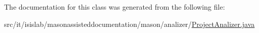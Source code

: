 The documentation for this class was generated from the following file\-:\begin{DoxyCompactItemize}
\item 
src/it/isislab/masonassisteddocumentation/mason/analizer/\hyperlink{_project_analizer_8java}{Project\-Analizer.\-java}\end{DoxyCompactItemize}
